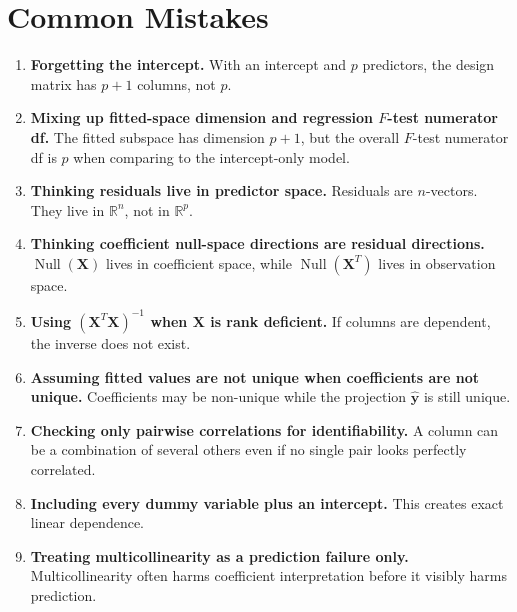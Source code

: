 \section{Common Mistakes}

\begin{enumerate}
  \item \textbf{Forgetting the intercept.}  With an intercept and \(p\) predictors, the design matrix has \(p+1\) columns, not \(p\).
  \item \textbf{Mixing up fitted-space dimension and regression \(F\)-test numerator df.}  The fitted subspace has dimension \(p+1\), but the overall \(F\)-test numerator df is \(p\) when comparing to the intercept-only model.
  \item \textbf{Thinking residuals live in predictor space.}  Residuals are \(n\)-vectors.  They live in \(\mathbb{R}^n\), not in \(\mathbb{R}^p\).
  \item \textbf{Thinking coefficient null-space directions are residual directions.}  \(\operatorname{Null}(\mathbf{X})\) lives in coefficient space, while \(\operatorname{Null}(\mathbf{X}^T)\) lives in observation space.
  \item \textbf{Using \((\mathbf{X}^T\mathbf{X})^{-1}\) when \(\mathbf{X}\) is rank deficient.}  If columns are dependent, the inverse does not exist.
  \item \textbf{Assuming fitted values are not unique when coefficients are not unique.}  Coefficients may be non-unique while the projection \(\widehat{\mathbf{y}}\) is still unique.
  \item \textbf{Checking only pairwise correlations for identifiability.}  A column can be a combination of several others even if no single pair looks perfectly correlated.
  \item \textbf{Including every dummy variable plus an intercept.}  This creates exact linear dependence.
  \item \textbf{Treating multicollinearity as a prediction failure only.}  Multicollinearity often harms coefficient interpretation before it visibly harms prediction.
\end{enumerate}

